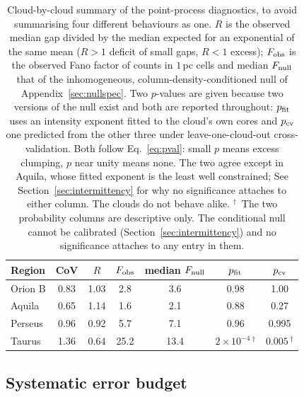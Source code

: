 \documentclass[usenatbib,twoside,twocolumn]{mnras}
\begin{document}
\begin{table}
\caption{Cloud-by-cloud summary of the point-process diagnostics, to avoid summarising four different behaviours as one. $R$ is the observed median gap divided by the median expected for an exponential of the same mean ($R>1$ deficit of small gaps, $R<1$ excess); $F_{\rm obs}$ is the observed Fano factor of counts in $1$\,pc cells and median $F_{\rm null}$ that of the inhomogeneous, column-density-conditioned null of Appendix~\ref{sec:nullspec}. Two $p$-values are given because two versions of the null exist and both are reported throughout: $p_{\rm fit}$ uses an intensity exponent fitted to the cloud's own cores and $p_{\rm cv}$ one predicted from the other three under leave-one-cloud-out cross-validation. Both follow Eq.~\ref{eq:pval}: small $p$ means excess clumping, $p$ near unity means none. The two agree except in Aquila, whose fitted exponent is the least well constrained; See Section~\ref{sec:intermittency} for why no significance attaches to either column. The clouds do not behave alike. $^{\dagger}$~The two probability columns are descriptive only. The conditional null cannot be calibrated (Section~\ref{sec:intermittency}) and no significance attaches to any entry in them.}
\label{tab:percloud}
\footnotesize
\setlength{\tabcolsep}{3.5pt}
\begin{tabular}{lcccccc}
\toprule
Region & CoV & $R$ & $F_{\rm obs}$ & median $F_{\rm null}$ & $p_{\rm fit}$ & $p_{\rm cv}$ \\
\midrule
Orion B & 0.83 & 1.03 & 2.8  & 3.6  & 0.98 & 1.00 \\
Aquila  & 0.65 & 1.14 & 1.6  & 2.1  & 0.88 & 0.27 \\
Perseus & 0.96 & 0.92 & 5.7  & 7.1  & 0.96 & 0.995 \\
Taurus  & 1.36 & 0.64 & 25.2 & 13.4 & $2\times10^{-4}$\,$^{\dagger}$ & $0.005$\,$^{\dagger}$ \\
\bottomrule
\end{tabular}
\end{table}

\subsection{Systematic error budget}
\label{sec:error_budget}
\end{document}
